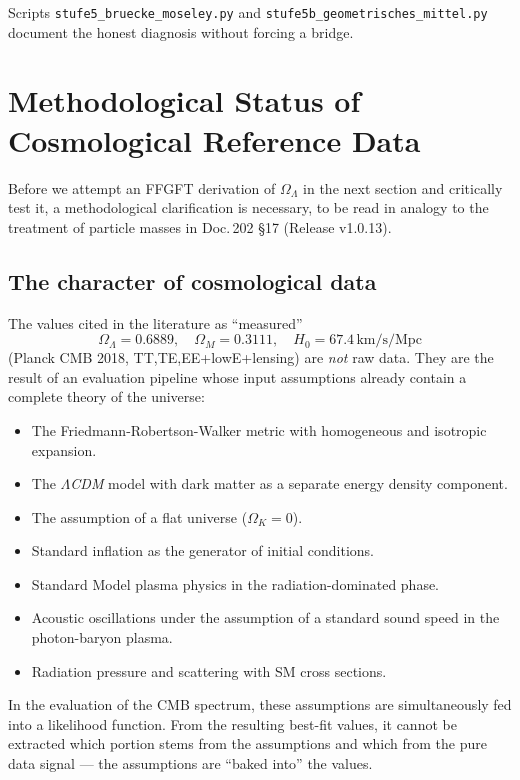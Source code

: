 Scripts \texttt{stufe5\_bruecke\_moseley.py} and \texttt{stufe5b\_geometrisches\_mittel.py} document the honest diagnosis without forcing a bridge.

\section{Methodological Status of Cosmological Reference Data}
\label{sec:cosmology_methodology}

Before we attempt an FFGFT derivation of \(\Omega_\Lambda\) in the next section and critically test it, a methodological clarification is necessary, to be read in analogy to the treatment of particle masses in Doc.\,202 \S17 (Release v1.0.13).

\subsection{The character of cosmological data}

The values cited in the literature as ``measured''
\begin{equation}
\Omega_\Lambda = 0.6889, \quad \Omega_M = 0.3111, \quad H_0 = 67.4\,\text{km/s/Mpc}
\end{equation}
(Planck CMB 2018, TT,TE,EE+lowE+lensing) are \emph{not} raw data. They are the result of an evaluation pipeline whose input assumptions already contain a complete theory of the universe:

\begin{itemize}
\item The Friedmann-Robertson-Walker metric with homogeneous and isotropic expansion.
\item The \emph{\(\Lambda\)CDM} model with dark matter as a separate energy density component.
\item The assumption of a flat universe (\(\Omega_K = 0\)).
\item Standard inflation as the generator of initial conditions.
\item Standard Model plasma physics in the radiation-dominated phase.
\item Acoustic oscillations under the assumption of a standard sound speed in the photon-baryon plasma.
\item Radiation pressure and scattering with SM cross sections.
\end{itemize}

In the evaluation of the CMB spectrum, these assumptions are simultaneously fed into a likelihood function. From the resulting best-fit values, it cannot be extracted which portion stems from the assumptions and which from the pure data signal --- the assumptions are ``baked into'' the values.

